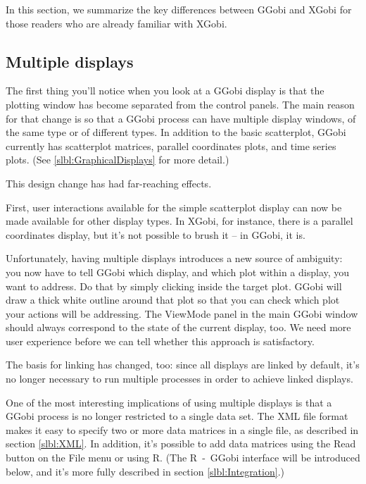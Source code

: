 \documentclass[11pt]{article}
\begin{document}
In this section, we summarize the key differences between GGobi
and XGobi for those readers who are already familiar with XGobi.

\subsection {Multiple displays}

The first thing you'll notice when you look at a GGobi display is
that the plotting window has become separated from the control
panels.  The main reason for that change is so that a GGobi process
can have multiple display windows, of the same type or of different
types.  In addition to the basic scatterplot, GGobi currently has
scatterplot matrices, parallel coordinates plots, and time series
plots.  (See \ref{slbl:GraphicalDisplays} for more detail.)

This design change has had far-reaching effects.

First, user interactions available for the simple scatterplot display
can now be made available for other display types.  In XGobi, for
instance, there is a parallel coordinates display, but it's not
possible to brush it -- in GGobi, it is.

Unfortunately, having multiple displays introduces a new source of
ambiguity: you now have to tell GGobi which display, and which plot
within a display, you want to address.  Do that by simply clicking
inside the target plot.  GGobi will draw a thick white outline around
that plot so that you can check which plot your actions will be
addressing.  The ViewMode panel in the main GGobi window should
always correspond to the state of the current display, too.  We need
more user experience before we can tell whether this approach is
satisfactory.

The basis for linking has changed, too:  since all displays are
linked by default, it's no longer necessary to run multiple processes
in order to achieve linked displays.

One of the most interesting implications of using multiple displays
is that a GGobi process is no longer restricted to a single data
set.  The XML file format makes it easy to specify two or more data
matrices in a single file, as described in section \ref{slbl:XML}.
In addition, it's possible to add data matrices using the Read button
on the File menu or using R.  (The R~-~GGobi interface will be
introduced below, and it's more fully described in section
\ref{slbl:Integration}.)
\end{document}
